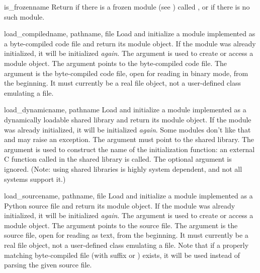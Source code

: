 \begin{funcdesc}{is_frozen}{name}
Return  if there is a frozen module (see
) called , or  if there is
no such module.
\end{funcdesc}

\begin{funcdesc}{load_compiled}{name, pathname, file}
Load and initialize a module implemented as a byte-compiled code file
and return its module object.  If the module was already initialized,
it will be initialized \emph{again}.  The  argument is used
to create or access a module object.  The  argument
points to the byte-compiled code file.  The 
argument is the byte-compiled code file, open for reading in binary
mode, from the beginning.
It must currently be a real file object, not a
user-defined class emulating a file.
\end{funcdesc}

\begin{funcdesc}{load_dynamic}{name, pathname}
Load and initialize a module implemented as a dynamically loadable
shared library and return its module object.  If the module was
already initialized, it will be initialized \emph{again}.  Some modules
don't like that and may raise an exception.  The 
argument must point to the shared library.  The  argument is
used to construct the name of the initialization function: an external
C function called  in the shared library is
called.  The optional  argument is ignored.  (Note: using
shared libraries is highly system dependent, and not all systems
support it.)
\end{funcdesc}

\begin{funcdesc}{load_source}{name, pathname, file}
Load and initialize a module implemented as a Python source file and
return its module object.  If the module was already initialized, it
will be initialized \emph{again}.  The  argument is used to
create or access a module object.  The  argument points
to the source file.  The  argument is the source
file, open for reading as text, from the beginning.
It must currently be a real file
object, not a user-defined class emulating a file.  Note that if a
properly matching byte-compiled file (with suffix  or
) exists, it will be used instead of parsing the given
source file.
\end{funcdesc}


